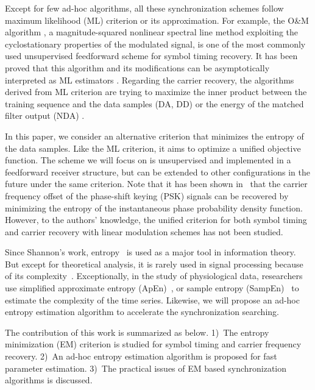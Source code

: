 \documentclass[journal,comsoc]{IEEEtran}
\begin{document}
Except for few ad-hoc algorithms, all these synchronization schemes follow maximum likelihood (ML) criterion or its approximation.
For example, the O\&M algorithm \cite{Oerder1988}, a magnitude-squared nonlinear spectral line method exploiting the cyclostationary properties of the modulated signal, is one of the most commonly used unsupervised  feedforward scheme for symbol timing recovery.
It has been proved that this algorithm and its modifications can be asymptotically interpreted as ML estimators \cite{YanWang2002,Lopez-Salcedo2006}.
Regarding the carrier recovery, the algorithms derived from ML criterion are trying to maximize the inner product between the  training sequence and the data samples (DA, DD) or the energy of the matched filter output (NDA) \cite{mengali1997synchronization}.

In this paper, we consider an alternative criterion that minimizes the entropy of the data samples. 
Like the ML criterion, it aims to optimize a unified objective function.
The scheme we will focus on is unsupervised and implemented in a feedforward receiver structure, but can be extended to other configurations in the future under the same criterion.
Note that it has been shown in~\cite{Pedzisz2006} that the carrier frequency offset of the phase-shift keying (PSK) signals can be recovered by minimizing the entropy of the instantaneous phase probability density function.
However, to the authors' knowledge,  the unified criterion for both symbol timing and carrier recovery with linear modulation schemes has not been studied.

Since Shannon's work, entropy~\cite{Shannon1948} is used as a major tool in information theory. 
But except for theoretical analysis, it is rarely used in signal processing because of its complexity~\cite{Bercher2000}.
Exceptionally, in the study of physiological data, researchers use simplified approximate entropy (ApEn)~\cite{Pincus1991}, or sample entropy (SampEn)~\cite{Richman2000} to estimate the complexity of the time series.
Likewise, we will propose an ad-hoc entropy estimation algorithm to accelerate the synchronization searching. 

The contribution of this work is summarized as below.
1)~The entropy minimization (EM) criterion is studied for symbol timing and carrier frequency recovery.
2)~An ad-hoc entropy estimation algorithm is proposed for fast parameter estimation.
3)~The practical issues of EM based synchronization algorithms is discussed. 
\end{document}
